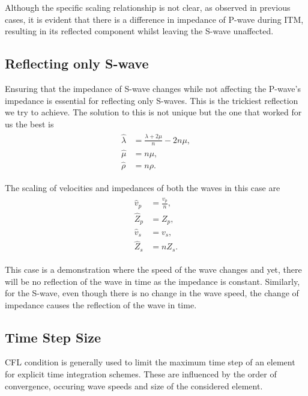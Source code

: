 Although the specific scaling relationship is not clear, as observed in previous cases, it is evident that there is a difference in impedance of P-wave during \ac{ITM},
resulting in its reflected component whilst leaving the S-wave unaffected.

\subsection{Reflecting only S-wave}\label{sec:reflecting_s}
Ensuring that the impedance of S-wave changes while not affecting the P-wave's impedance is essential for reflecting only S-waves. This is the trickiest
reflection we try to achieve. The solution to this is not unique but the one that worked for us the best is
\begin{align}
    \begin{split}
        \hat{\lambda} &= \frac{\lambda + 2 \mu}{n} -  2n \mu ,\\
        \hat{\mu} &= n \mu ,\\
        \hat{\rho} &= n \rho .
    \end{split}
\end{align}

The scaling of velocities and impedances of both the waves in this case are
\begin{align}
    \begin{split}
        \hat{v}_p &= \frac{v_p}{n} ,\\
        \hat{Z}_p &= Z_p ,\\
        \hat{v}_s &= v_s ,\\
        \hat{Z}_s &= n Z_s .
    \end{split}
\end{align}

This case is a demonstration where the speed of the wave changes and yet, there will be no reflection of the wave in time as the impedance is constant.
Similarly, for the S-wave, even though there is no change in the wave speed, the change of impedance causes the reflection of the wave in time.

\subsection{Time Step Size}\label{sec:time_step_size}
\ac{CFL} condition is generally used to limit the maximum time step of an element for explicit time integration schemes. These are influenced by the order
of convergence, occuring wave speeds and size of the considered element.

